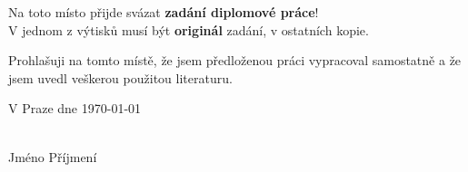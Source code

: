 
\newpage

\thispagestyle{empty}

\noindent
{\Large
Na toto místo přijde svázat \textbf{zadání diplomové práce}!\\
V jednom z výtisků musí být \textbf{originál} zadání, v ostatních kopie.\par}


\newpage

\thispagestyle{empty}



\vspace{0.5cm}

Prohlašuji na tomto místě, že jsem předloženou práci vypracoval samostatně 
a že jsem uvedl veškerou použitou literaturu.

\vspace{1.5cm}

\noindent
\begin{minipage}[b]{5cm}
V Praze dne \today
\end{minipage}
\hfill
\begin{minipage}[t]{5cm}
\begin{center}
\dotfill\\
Jméno Příjmení
\end{center}
\end{minipage}

\vspace*{2cm}


\newpage

\thispagestyle{empty}

